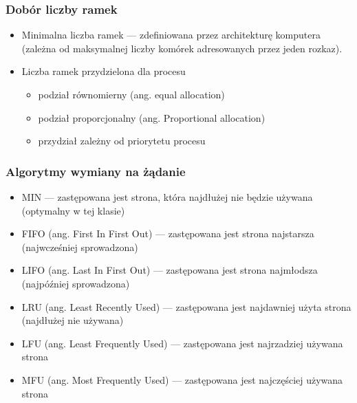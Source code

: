 \documentclass[12pt]{article}
\begin{document}
    \subsubsection{Dobór liczby ramek}
    \begin{itemize}
        \item Minimalna liczba ramek — zdefiniowana przez architekturę komputera (zależna od maksymalnej liczby komórek adresowanych
        przez jeden rozkaz).
        \item Liczba ramek przydzielona dla procesu
        \begin{itemize}
            \item podział równomierny (ang. equal allocation)
            \item podział proporcjonalny (ang. Proportional allocation)
            \item przydział zależny od priorytetu procesu
        \end{itemize}
    \end{itemize}
    
    \subsubsection{Algorytmy wymiany na żądanie}
    \begin{itemize}
        \item MIN — zastępowana jest strona, która najdłużej nie będzie używana (optymalny w tej klasie)
        \item FIFO (ang. First In First Out) — zastępowana jest strona najstarsza (najwcześniej sprowadzona)
        \item LIFO (ang. Last In First Out) — zastępowana jest strona najmłodsza (najpóźniej sprowadzona)
        \item LRU (ang. Least Recently Used) — zastępowana jest najdawniej użyta strona (najdłużej nie używana)
        \item LFU (ang. Least Frequently Used) — zastępowana jest najrzadziej używana strona
        \item MFU (ang. Most Frequently Used) — zastępowana jest najczęściej używana strona
    \end{itemize}
    
\end{document}
